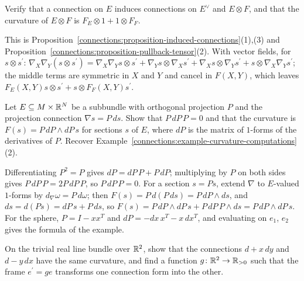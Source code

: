 \begin{exercise}\label{connections:exercise-induced-connections}
Verify that a connection on $E$ induces connections on $E^\vee$ and $E \otimes F$, and that the curvature of $E \otimes F$ is $F_E \otimes 1 + 1 \otimes F_F$.
\end{exercise}

\begin{solution}
This is Proposition~\ref{connections:proposition-induced-connections}(1),(3) and Proposition~\ref{connections:proposition-pullback-tensor}(2). With vector fields, for
$s \otimes s^{\prime}$: $\nabla_X\nabla_Y(s \otimes s^{\prime}) = \nabla_X\nabla_Ys \otimes s^{\prime} + \nabla_Ys \otimes \nabla_Xs^{\prime} + \nabla_Xs \otimes \nabla_Ys^{\prime} + s \otimes \nabla_X\nabla_Ys^{\prime}$; the
middle terms are symmetric in $X$ and $Y$ and cancel in $F(X, Y)$, which leaves $F_E(X, Y)s \otimes s^{\prime} + s \otimes F_F(X, Y)s^{\prime}$.
\end{solution}

\begin{exercise}\label{connections:exercise-projection-curvature}
Let $E \subseteq M \times \mathbb{R}^N$ be a subbundle with orthogonal projection $P$ and the projection connection $\nabla s = P\,ds$. Show that $P\,dP\,P = 0$ and that the curvature is
$F(s) = P\,dP \wedge dP\,s$ for sections $s$ of $E$, where $dP$ is the matrix of $1$-forms of the derivatives of $P$. Recover Example~\ref{connections:example-curvature-computations}(2).
\end{exercise}

\begin{solution}
Differentiating $P^2 = P$ gives $dP = dP\,P + P\,dP$; multiplying by $P$ on both sides gives $P\,dP\,P = 2P\,dP\,P$, so $P\,dP\,P = 0$. For a section $s = Ps$, extend $\nabla$ to
$E$-valued $1$-forms by $d_\nabla\omega = P\,d\omega$; then $F(s) = P\,d(P\,ds) = P\,dP \wedge ds$, and $ds = d(Ps) = dP\,s + P\,ds$, so
$F(s) = P\,dP \wedge dP\,s + P\,dP\,P \wedge ds = P\,dP \wedge dP\,s$. For the sphere, $P = I - xx^T$ and $dP = -dx\,x^T - x\,dx^T$, and evaluating on $e_1$, $e_2$ gives the
formula of the example.
\end{solution}

\begin{exercise}\label{connections:exercise-gauge-plane}
On the trivial real line bundle over $\mathbb{R}^2$, show that the connections $d + x\,dy$ and $d - y\,dx$ have the same curvature, and find a function $g \colon \mathbb{R}^2 \to \mathbb{R}_{>0}$
such that the frame $e^{\prime} = ge$ transforms one connection form into the other.
\end{exercise}


